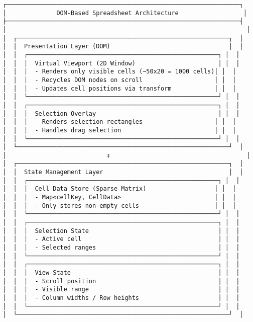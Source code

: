 \documentclass[11pt]{article}
\begin{document}
\begin{verbatim}
┌─────────────────────────────────────────────────────────────────┐
│              DOM-Based Spreadsheet Architecture                  │
├─────────────────────────────────────────────────────────────────┤
│                                                                   │
│  ┌───────────────────────────────────────────────────────────┐  │
│  │  Presentation Layer (DOM)                                 │  │
│  │  ┌─────────────────────────────────────────────────────┐ │  │
│  │  │  Virtual Viewport (2D Window)                       │ │  │
│  │  │  - Renders only visible cells (~50x20 = 1000 cells)│ │  │
│  │  │  - Recycles DOM nodes on scroll                    │ │  │
│  │  │  - Updates cell positions via transform            │ │  │
│  │  └─────────────────────────────────────────────────────┘ │  │
│  │  ┌─────────────────────────────────────────────────────┐ │  │
│  │  │  Selection Overlay                                  │ │  │
│  │  │  - Renders selection rectangles                    │ │  │
│  │  │  - Handles drag selection                          │ │  │
│  │  └─────────────────────────────────────────────────────┘ │  │
│  └───────────────────────────────────────────────────────────┘  │
│                            ↕                                      │
│  ┌───────────────────────────────────────────────────────────┐  │
│  │  State Management Layer                                   │  │
│  │  ┌─────────────────────────────────────────────────────┐ │  │
│  │  │  Cell Data Store (Sparse Matrix)                   │ │  │
│  │  │  - Map<cellKey, CellData>                          │ │  │
│  │  │  - Only stores non-empty cells                     │ │  │
│  │  └─────────────────────────────────────────────────────┘ │  │
│  │  ┌─────────────────────────────────────────────────────┐ │  │
│  │  │  Selection State                                    │ │  │
│  │  │  - Active cell                                      │ │  │
│  │  │  - Selected ranges                                  │ │  │
│  │  └─────────────────────────────────────────────────────┘ │  │
│  │  ┌─────────────────────────────────────────────────────┐ │  │
│  │  │  View State                                         │ │  │
│  │  │  - Scroll position                                  │ │  │
│  │  │  - Visible range                                    │ │  │
│  │  │  - Column widths / Row heights                      │ │  │
│  │  └─────────────────────────────────────────────────────┘ │  │
│  └───────────────────────────────────────────────────────────┘  │

\end{verbatim}
\end{document}
